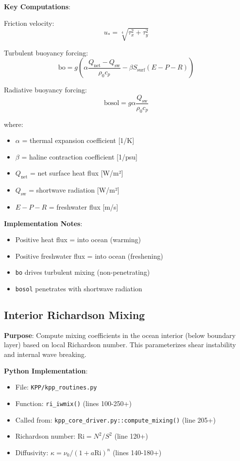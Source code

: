 \documentclass[11pt]{article}
\begin{document}
\textbf{Key Computations}:

Friction velocity:
\begin{equation}
u_* = \sqrt[4]{\tau_x^2 + \tau_y^2}
\end{equation}

Turbulent buoyancy forcing:
\begin{equation}
\text{bo} = g \left( \alpha \frac{Q_{\text{net}} - Q_{\text{sw}}}{\rho_0 c_p} - \beta S_{\text{surf}} (E - P - R) \right)
\end{equation}

Radiative buoyancy forcing:
\begin{equation}
\text{bosol} = g \alpha \frac{Q_{\text{sw}}}{\rho_0 c_p}
\end{equation}

where:
\begin{itemize}
    \item $\alpha$ = thermal expansion coefficient [1/K]
    \item $\beta$ = haline contraction coefficient [1/psu]
    \item $Q_{\text{net}}$ = net surface heat flux [W/m²]
    \item $Q_{\text{sw}}$ = shortwave radiation [W/m²]
    \item $E - P - R$ = freshwater flux [m/s]
\end{itemize}

\textbf{Implementation Notes}:
\begin{itemize}
    \item Positive heat flux = into ocean (warming)
    \item Positive freshwater flux = into ocean (freshening)
    \item \verb|bo| drives turbulent mixing (non-penetrating)
    \item \verb|bosol| penetrates with shortwave radiation
\end{itemize}

\subsection{Interior Richardson Mixing}

\textbf{Purpose}: Compute mixing coefficients in the ocean interior (below boundary layer) based on local Richardson number. This parameterizes shear instability and internal wave breaking.

\textbf{Python Implementation}:
\begin{itemize}
    \item File: \verb|KPP/kpp_routines.py|
    \item Function: \verb|ri_iwmix()| (lines 100-250+)
    \item Called from: \verb|kpp_core_driver.py::compute_mixing()| (line 205+)
    \item Richardson number: $\text{Ri} = N^2 / S^2$ (line 120+)
    \item Diffusivity: $\kappa = \nu_0 / (1 + a \text{Ri})^n$ (lines 140-180+)
\end{itemize}
\end{document}
